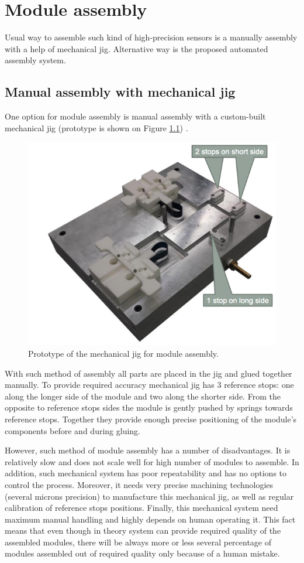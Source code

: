 \chapter{Module assembly}

Usual way to assemble such kind of high-precision sensors is a manually assembly with a help of mechanical jig. Alternative way is the proposed automated assembly system.

\section{Manual assembly with mechanical jig}

One option for module assembly is manual assembly with a custom-built mechanical jig (prototype is shown on Figure \ref{fig:mechanical_jig}) \cite{Automated_assembly_slides}.

\begin{figure}[ht]\centering
\includegraphics[width=0.7\linewidth]{Data/Module_assembly/Mechanical_jig.png}
\caption{Prototype of the mechanical jig for module assembly.}
\label{fig:mechanical_jig}
\end{figure}

With such method of assembly all parts are placed in the jig and glued together manually. To provide required accuracy mechanical jig has 3 reference stops: one along the longer side of the module and two along the shorter side. From the opposite to reference stops sides the module is gently pushed by springs towards reference stops. Together they provide enough precise positioning of the module's components before and during gluing.

However, such method of module assembly has a number of disadvantages. It is relatively slow and does not scale well for high number of modules to assemble. In addition, such mechanical system has poor repeatability and has no options to control the process. Moreover, it needs very precise machining technologies (several microns precision) to manufacture this mechanical jig, as well as regular calibration of reference stops positions. Finally, this mechanical system need maximum manual handling and highly depends on human operating it. This fact means that even though in theory system can provide required quality of the assembled modules, there will be always more or less several percentage of modules assembled out of required quality only because of a human mistake.

